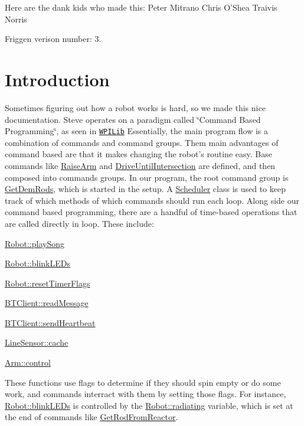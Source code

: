 Here are the dank kids who made this\-:  Peter Mitrano  Chris O'Shea  Traivis Norris

Friggen verison number\-:  3.\hypertarget{index_Introduction}{}\section{Introduction}\label{index_Introduction}
Sometimes figuring out how a robot works is hard, so we made this nice documentation. Steve operates on a paradigm called \char`\"{}\-Command Based Programming\char`\"{}, as seen in \href{https://wpilib.screenstepslive.com/s/4485/m/13809/l/241892-what-is-command-based-programming}{\tt W\-P\-I\-Lib} Essentially, the main program flow is a combination of commands and command groups. Them main advantages of command based are that it makes changing the robot's routine easy. Base commands like \hyperlink{classRaiseArm}{Raise\-Arm} and \hyperlink{classDriveUntilIntersection}{Drive\-Until\-Intersection} are defined, and then composed into commands groups. In our program, the root command group is \hyperlink{classGetDemRods}{Get\-Dem\-Rods}, which is started in the setup. A \hyperlink{classScheduler}{Scheduler} class is used to keep track of which methods of which commands should run each loop. Along side our command based programming, there are a handful of time-\/based operations that are called directly in loop. These include\-:
\begin{DoxyItemize}
\item \hyperlink{classRobot_ad86dbbb2ad0d065f3e4c30fd4b742e1c}{Robot\-::play\-Song}
\item \hyperlink{classRobot_a4215f7e880311c2118f387df75effaf2}{Robot\-::blink\-L\-E\-Ds}
\item \hyperlink{classRobot_ab7c87529c987ede12b934bdfc768507e}{Robot\-::reset\-Timer\-Flags}
\item \hyperlink{classBTClient_a8e827d16926d45a4b7c18dda0e59837b}{B\-T\-Client\-::read\-Message}
\item \hyperlink{classBTClient_a4bf8f58f2c83834cab585e69c55c171f}{B\-T\-Client\-::send\-Heartbeat}
\item \hyperlink{classLineSensor_afc809d2aa49426d949f76f68b0154050}{Line\-Sensor\-::cache}
\item \hyperlink{classArm_a009c19e5b213f692c24eab792cc40c47}{Arm\-::control}
\end{DoxyItemize}

These functions use flags to determine if they should spin empty or do some work, and commands interract with them by setting those flags. For instance, \hyperlink{classRobot_a4215f7e880311c2118f387df75effaf2}{Robot\-::blink\-L\-E\-Ds} is controlled by the \hyperlink{classRobot_a77f62d85ab1cf34e79c2a3acd470a4ce}{Robot\-::radiating} variable, which is set at the end of commands like \hyperlink{classGetRodFromReactor}{Get\-Rod\-From\-Reactor}. 